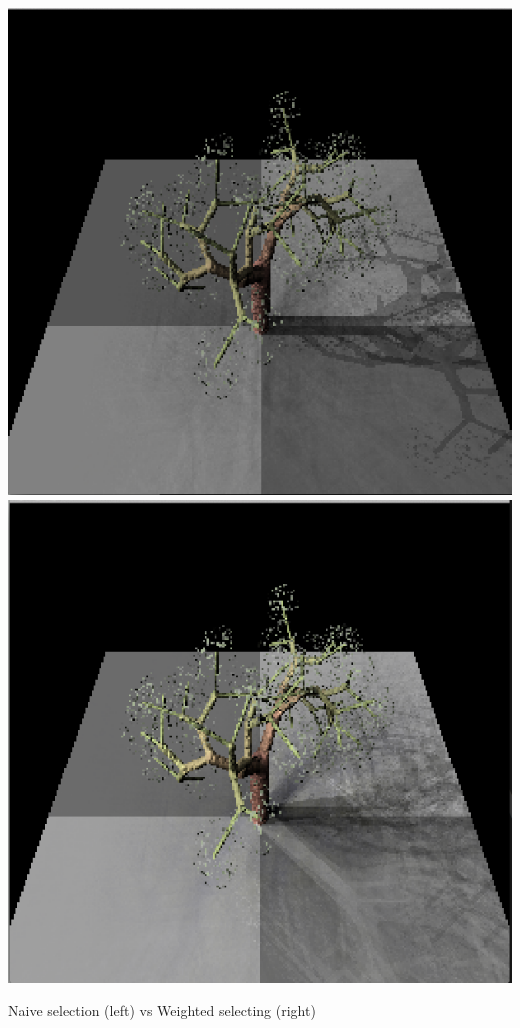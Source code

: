 \documentclass[11pt]{article}
\begin{document}
\begin{table}
  \centering
  \includegraphics[width=.4\linewidth]{figs/naive}
  \includegraphics[width=.4\linewidth]{figs/weighted}
  \caption{Naive selection (left) vs Weighted selecting (right)}
\end{table}
\end{document}
